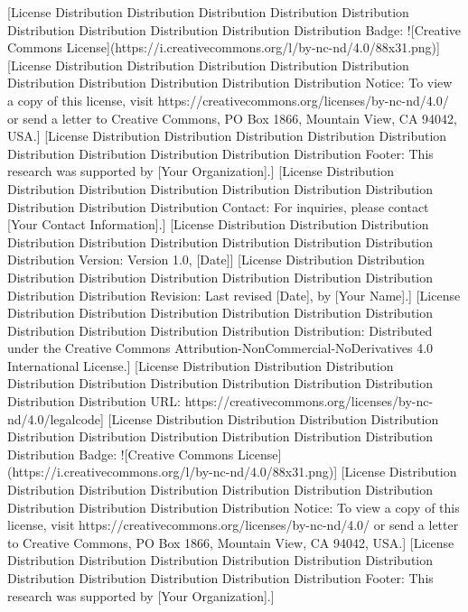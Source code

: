 [License Distribution Distribution Distribution Distribution Distribution Distribution Distribution Distribution Distribution Distribution Badge: ![Creative Commons License](https://i.creativecommons.org/l/by-nc-nd/4.0/88x31.png)]  
[License Distribution Distribution Distribution Distribution Distribution Distribution Distribution Distribution Distribution Distribution Notice: To view a copy of this license, visit https://creativecommons.org/licenses/by-nc-nd/4.0/ or send a letter to Creative Commons, PO Box 1866, Mountain View, CA 94042, USA.]  
[License Distribution Distribution Distribution Distribution Distribution Distribution Distribution Distribution Distribution Distribution Footer: This research was supported by [Your Organization].]  
[License Distribution Distribution Distribution Distribution Distribution Distribution Distribution Distribution Distribution Distribution Contact: For inquiries, please contact [Your Contact Information].]  
[License Distribution Distribution Distribution Distribution Distribution Distribution Distribution Distribution Distribution Distribution Version: Version 1.0, [Date]]  
[License Distribution Distribution Distribution Distribution Distribution Distribution Distribution Distribution Distribution Distribution Revision: Last revised [Date], by [Your Name].]  
[License Distribution Distribution Distribution Distribution Distribution Distribution Distribution Distribution Distribution Distribution Distribution: Distributed under the Creative Commons Attribution-NonCommercial-NoDerivatives 4.0 International License.]  
[License Distribution Distribution Distribution Distribution Distribution Distribution Distribution Distribution Distribution Distribution Distribution URL: https://creativecommons.org/licenses/by-nc-nd/4.0/legalcode]  
[License Distribution Distribution Distribution Distribution Distribution Distribution Distribution Distribution Distribution Distribution Distribution Badge: ![Creative Commons License](https://i.creativecommons.org/l/by-nc-nd/4.0/88x31.png)]  
[License Distribution Distribution Distribution Distribution Distribution Distribution Distribution Distribution Distribution Distribution Distribution Notice: To view a copy of this license, visit https://creativecommons.org/licenses/by-nc-nd/4.0/ or send a letter to Creative Commons, PO Box 1866, Mountain View, CA 94042, USA.]  
[License Distribution Distribution Distribution Distribution Distribution Distribution Distribution Distribution Distribution Distribution Distribution Footer: This research was supported by [Your Organization].]  

